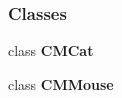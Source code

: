 \subsubsection*{Classes}
\begin{DoxyCompactItemize}
\item 
class {\bf C\-M\-Cat}
\item 
class {\bf C\-M\-Mouse}
\end{DoxyCompactItemize}
